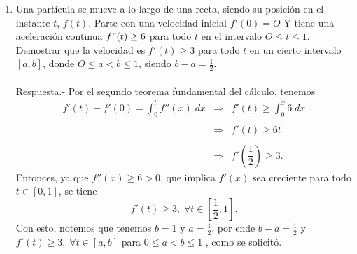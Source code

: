 \begin{enumerate}[\bfseries 1.]
    \item Una partícula se mueve a lo largo de una recta, siendo su posición en el instante $t$, $f(t)$. Parte con una velocidad inicial $f'(0) = O$ Y tiene una aceleración continua $f"(t) \geq 6$ para todo $t$ en el intervalo $O \leq t \leq 1$. Demostrar que la velocidad es $f'(t) \geq 3$ para todo $t$ en un cierto intervalo $[a, b]$, donde $O \leq a < b \leq 1$, siendo $b - a =\frac{1}{2}$.\\\\
	Respuesta.-\; Por el segundo teorema fundamental del cálculo, tenemos
	$$\begin{array}{rcl}
	    \displaystyle f'(t)-f'(0) = \int_0^t f''(x)\; dx&\Rightarrow & \displaystyle f'(t)\geq \int_0^x 6\; dx\\\\
							    &\Rightarrow& f'(t)\geq 6t\\\\
							    &\Rightarrow& f'\left(\dfrac{1}{2}\right)\geq 3.
	\end{array}$$
	Entonces, ya que $f''(x)\geq 6>0$, que implica $f'(x)$ sea creciente para todo $t\in[0,1]$, se tiene
	$$f'(t)\geq 3,\; \forall t\in\left[\dfrac{1}{2},1\right].$$
	Con esto, notemos que tenemos $b=1$ y $a=\frac{1}{2}$, por ende $b-a=\frac{1}{2}$ y $f'(t)\geq 3,\; \forall t\in[a,b]$ para $0\leq a<b\leq 1$ , como se solicitó.\\\\


\end{enumerate}
